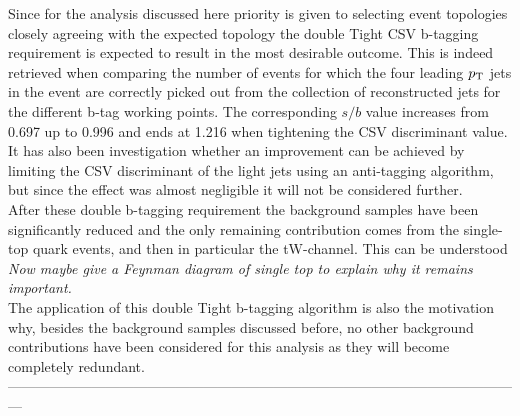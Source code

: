 Since for the analysis discussed here priority is given to selecting event topologies closely agreeing with the expected topology the double Tight CSV b-tagging requirement is expected to result in the most desirable outcome.
This is indeed retrieved when comparing the number of events for which the four leading $p_{\rm T}$ jets in the event are correctly picked out from the collection of reconstructed jets for the different b-tag working points. The corresponding $s/b$ value increases from 0.697 up to 0.996 and ends at 1.216 when tightening the CSV discriminant value.
It has also been investigation whether an improvement can be achieved by limiting the CSV discriminant of the light jets using an anti-tagging algorithm, but since the effect was almost negligible it will not be considered further.
\\

After these double b-tagging requirement the background samples have been significantly reduced and the only remaining contribution comes from the single-top quark events, and then in particular the tW-channel.
This can be understood 
\\
\textit{Now maybe give a Feynman diagram of single top to explain why it remains important.}\\
The application of this double Tight b-tagging algorithm is also the motivation why, besides the background samples discussed before, no other background contributions have been considered for this analysis as they will become completely redundant.
\\
---------------------------------------------------------------------------------------------------------------
\\

